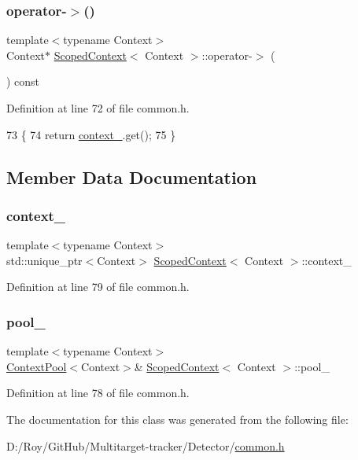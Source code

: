 \subsubsection{\texorpdfstring{operator-\/$>$()}{operator->()}}
{\footnotesize\ttfamily template$<$typename Context$>$ \\
Context$\ast$ \mbox{\hyperlink{class_scoped_context}{Scoped\+Context}}$<$ Context $>$\+::operator-\/$>$ (\begin{DoxyParamCaption}{ }\end{DoxyParamCaption}) const\hspace{0.3cm}{\ttfamily [inline]}}



Definition at line 72 of file common.\+h.


\begin{DoxyCode}
73     \{
74         \textcolor{keywordflow}{return} \mbox{\hyperlink{class_scoped_context_afe2f4971fc3620e98791cc844454956e}{context\_}}.get();
75     \}
\end{DoxyCode}


\subsection{Member Data Documentation}
\mbox{\label{class_scoped_context_afe2f4971fc3620e98791cc844454956e}} 
\subsubsection{\texorpdfstring{context\+\_\+}{context\_}}
{\footnotesize\ttfamily template$<$typename Context$>$ \\
std\+::unique\+\_\+ptr$<$Context$>$ \mbox{\hyperlink{class_scoped_context}{Scoped\+Context}}$<$ Context $>$\+::context\+\_\+\hspace{0.3cm}{\ttfamily [private]}}



Definition at line 79 of file common.\+h.

\mbox{\label{class_scoped_context_a6aa628deb422cd0304c7b2eb311f8185}} 
\subsubsection{\texorpdfstring{pool\+\_\+}{pool\_}}
{\footnotesize\ttfamily template$<$typename Context$>$ \\
\mbox{\hyperlink{common_8h_a59ab5d85bff9594312b035d548be298f}{Context\+Pool}}$<$Context$>$\& \mbox{\hyperlink{class_scoped_context}{Scoped\+Context}}$<$ Context $>$\+::pool\+\_\+\hspace{0.3cm}{\ttfamily [private]}}



Definition at line 78 of file common.\+h.



The documentation for this class was generated from the following file\+:\begin{DoxyCompactItemize}
\item 
D\+:/\+Roy/\+Git\+Hub/\+Multitarget-\/tracker/\+Detector/\mbox{\hyperlink{common_8h}{common.\+h}}\end{DoxyCompactItemize}

